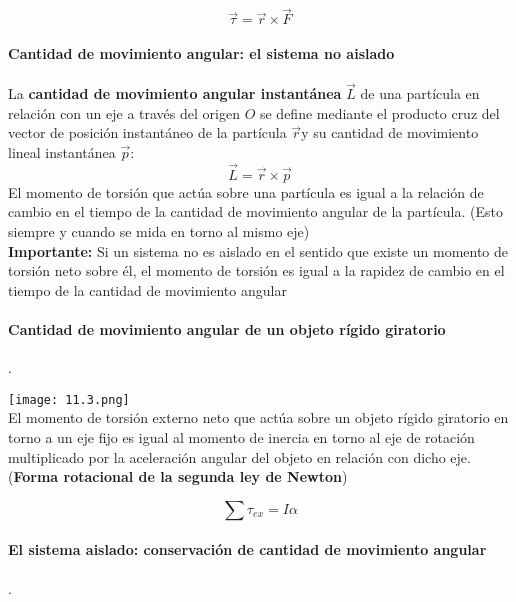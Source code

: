 \documentclass[10pt]{article}
\begin{document}
\begin{equation*}
	\overrightarrow{\tau} = \overrightarrow{r} \times \overrightarrow{F}
\end{equation*}

\paragraph{Cantidad de movimiento angular: el sistema no aislado}

La \textbf{cantidad de movimiento angular instantánea} $\overrightarrow{L}$ de una partícula en relación con un eje a través del origen $O$ se define mediante el producto cruz del vector de posición instantáneo de la partícula $\overrightarrow{r}$y su cantidad de movimiento lineal instantánea $\overrightarrow{p}$:
\begin{equation*}
	\overrightarrow{L} = \overrightarrow{r} \times \overrightarrow{p}
\end{equation*}
El momento de torsión que actúa sobre una partícula es igual a la relación de cambio en el tiempo de la cantidad de movimiento angular de la partícula. (Esto siempre y cuando se mida en torno al mismo eje)\\
\linebreak
\textbf{Importante:}  Si un sistema no es aislado en el sentido que existe un momento de torsión neto sobre él, el momento de torsión es igual a la rapidez de cambio en el tiempo de la cantidad de movimiento angular

\paragraph{Cantidad de movimiento angular de un objeto rígido giratorio}.

\texttt{[image: 11.3.png]}\\

El momento de torsión externo neto que actúa sobre un objeto rígido giratorio en torno a un eje fijo es igual al momento de inercia en torno al eje de rotación multiplicado por la aceleración angular del objeto en relación con dicho eje. (\textbf{Forma rotacional de la segunda ley de Newton})

\begin{equation*}
	\sum \tau_{ex} = I \alpha
\end{equation*}

\paragraph{El sistema aislado: conservación de cantidad de movimiento angular}.\\
\end{document}
